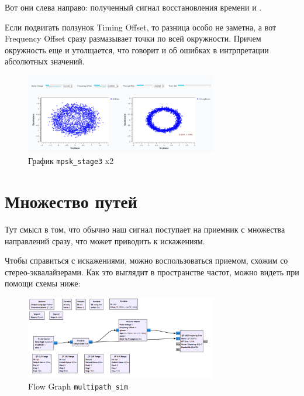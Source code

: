 \documentclass[a4paper,12pt]{report}
\begin{document}
    Вот они слева направо: полученный сигнал  восстановления времени и .
    
    Если подвигать ползунок Timing Offset, то разница особо не заметна, а вот Frequency Offset сразу размазывает точки по всей окружности. Причем окружность еще и утолщается, что говорит и об ошибках в интрпретации абсолютных значений.
    
    \begin{figure}[H]
        \centering
        \includegraphics[width=0.75\textwidth]{images/mpsk_stage3_plot_freq.png}
        \caption{График \texttt{mpsk\_stage3} x2}
        \label{fig:mpsk_stage3_plot_freq}
    \end{figure}
    
    \chapter{Множество путей}
    
    Тут смысл в том, что обычно наш сигнал поступает на приемник с множества направлений сразу, что может приводить к искажениям.
    
    Чтобы справиться с искажениями, можно воспользоваться приемом, схожим со стерео-эквалайзерами. Как это выглядит в пространстве частот, можно видеть при помощи схемы ниже:
    
    \begin{figure}[H]
        \centering
        \includegraphics[width=0.75\textwidth]{images/multipath_sim_fg.png}
        \caption{Flow Graph \texttt{multipath\_sim}}
        \label{fig:multipath_sim_fg}
    \end{figure}
    
\end{document}
